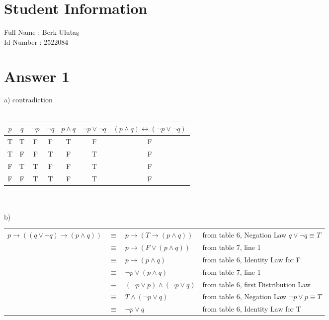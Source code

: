 \documentclass[12pt]{article}
\begin{document}
\section*{Student Information } 
Full Name : Berk Ulutaş \\
Id Number : 2522084 \\

\section*{Answer 1}

a) contradiction \\ \\ 
\begin{tabular}{c|c|c|c|c|c|c}
$p$ & $q$ & $\lnot p$ & $\lnot q$ & $p \land q$ & $\lnot p \lor \lnot q $ & $(p \land q ) \leftrightarrow (\lnot p \lor \lnot q)$ \\
\hline
T & T & F & F & T & F & F\\
T & F & F & T & F & T & F\\
F & T & T & F & F & T & F\\
F & F & T & T & F & T & F\\
\end{tabular}
\\
\\
b) \\
\begin{tabular}{l c l l }
    $ p \rightarrow ((q \lor \lnot q ) \rightarrow (p \land q))$ & $\equiv$ & $ p \rightarrow (T \rightarrow (p \land q))$ & {\hspace{10pt} from table 6, Negation Law $ q \lor \lnot q \equiv T $} \\
    & $\equiv$ & $ p \rightarrow (F \lor (p \land q))$ & {\hspace{10pt} from table 7, line 1}\\
    & $\equiv$ & $ p \rightarrow (p \land q) $ & {\hspace{10pt} from table 6, Identity Law for F}\\
    & $\equiv$ & $ \lnot p \lor (p \land q)$ & {\hspace{10pt} from table 7, line 1}\\
    & $\equiv$ & $ (\lnot p \lor p) \land (\lnot p \lor q)$ & {\hspace{10pt} from table 6, first Distribution Law}\\ 
    & $\equiv$ & $ T \land (\lnot p \lor q)$ & {\hspace{10pt} from table 6, Negation Law $\lnot p \lor p \equiv T$}\\
    & $\equiv$ & $\lnot p \lor q $ & {\hspace{10pt} from table 6, Identity Law for T}
    
\end{tabular}
\end{document}

